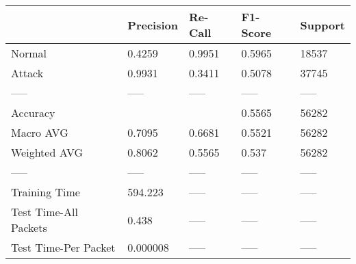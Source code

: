 \begin{tabular}{lllll}
\toprule
{} & Precision & Re-Call & F1-Score & Support \\
\midrule
Normal                &    0.4259 &  0.9951 &   0.5965 &   18537 \\
Attack                &    0.9931 &  0.3411 &   0.5078 &   37745 \\
-----                 &     ----- &   ----- &    ----- &   ----- \\
Accuracy              &           &         &   0.5565 &   56282 \\
Macro AVG             &    0.7095 &  0.6681 &   0.5521 &   56282 \\
Weighted AVG          &    0.8062 &  0.5565 &    0.537 &   56282 \\
-----                 &     ----- &   ----- &    ----- &   ----- \\
Training Time         &   594.223 &   ----- &    ----- &   ----- \\
Test Time-All Packets &     0.438 &   ----- &    ----- &   ----- \\
Test Time-Per Packet  &  0.000008 &   ----- &    ----- &   ----- \\
\bottomrule
\end{tabular}

